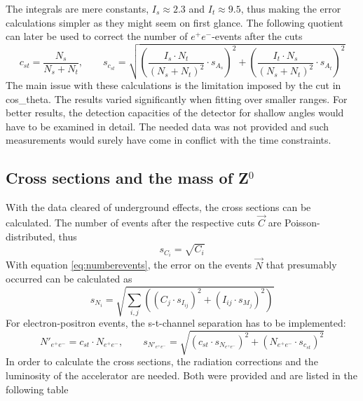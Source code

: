The integrals are mere constants, $I_s\approx2.3$ and $I_t\approx9.5$, thus making the error calculations simpler as they might seem on first glance. The following quotient can later be used to correct the number of $e^+e^-$-events after the cuts
\begin{equation}
c_{st}=\frac{N_s}{N_s+N_t},\qquad s_{c_{st}}=\sqrt{\left(\frac{I_s\cdot N_t}{(N_s+N_t)^2}\cdot s_{A_s}\right)^2+\left(\frac{I_t\cdot N_s}{(N_s+N_t)^2}\cdot s_{A_t}\right)^2}
\end{equation}
The main issue with these calculations is the limitation imposed by the cut in cos\_theta. The results varied significantly when fitting over smaller ranges. For better results, the detection capacities of the detector for shallow angles would have to be examined in detail. The needed data was not provided and such measurements would surely have come in conflict with the time constraints.
\subsection{Cross sections and the mass of Z$^0$}
With the data cleared of underground effects, the cross sections can be calculated. The number of events after the respective cuts $\vec{C}$ are Poisson-distributed, thus
\begin{equation}
s_{C_i}=\sqrt{C_i}
\end{equation}
With equation \ref{eq:numberevents}, the error on the events $\vec{N}$ that presumably occurred can be calculated as
\begin{equation}
s_{N_i}=\sqrt{\sum_{i,j}\left((C_j\cdot s_{I_{ij}})^2+(I_{ij}\cdot s_{M_j})^2\right)}
\end{equation}
For electron-positron events, the s-t-channel separation has to be implemented:
\begin{equation}
N'_{e^+e^-}=c_{st}\cdot N_{e^+e^-}, \qquad s_{N'_{e^+e^-}}=\sqrt{(c_{st}\cdot s_{N_{e^+e^-}})^2+(N_{e^+e^-}\cdot s_{c_{st}})^2}
\end{equation}
In order to calculate the cross sections, the radiation corrections and the luminosity of the accelerator are needed. Both were provided and are listed in the following table

